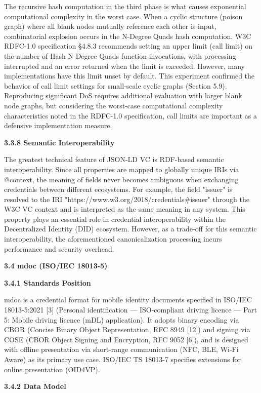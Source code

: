 The recursive hash computation in the third phase is what causes exponential computational complexity in the worst case. When a cyclic structure (poison graph) where all blank nodes mutually reference each other is input, combinatorial explosion occurs in the N-Degree Quads hash computation. W3C RDFC-1.0 specification §4.8.3 recommends setting an upper limit (call limit) on the number of Hash N-Degree Quads function invocations, with processing interrupted and an error returned when the limit is exceeded. However, many implementations have this limit unset by default. This experiment confirmed the behavior of call limit settings for small-scale cyclic graphs (Section 5.9). Reproducing significant DoS requires additional evaluation with larger blank node graphs, but considering the worst-case computational complexity characteristics noted in the RDFC-1.0 specification, call limits are important as a defensive implementation measure.

\textbf{3.3.8 Semantic Interoperability}

The greatest technical feature of JSON-LD VC is RDF-based semantic interoperability. Since all properties are mapped to globally unique IRIs via @context, the meaning of fields never becomes ambiguous when exchanging credentials between different ecosystems. For example, the field "issuer" is resolved to the IRI "https://www.w3.org/2018/credentials\#issuer" through the W3C VC context and is interpreted as the same meaning in any system. This property plays an essential role in credential interoperability within the Decentralized Identity (DID) ecosystem. However, as a trade-off for this semantic interoperability, the aforementioned canonicalization processing incurs performance and security overhead.

\textbf{3.4 mdoc (ISO/IEC 18013-5)}

\textbf{3.4.1 Standards Position}

mdoc is a credential format for mobile identity documents specified in ISO/IEC 18013-5:2021 {[}3{]} (Personal identification --- ISO-compliant driving licence --- Part 5: Mobile driving licence (mDL) application). It adopts binary encoding via CBOR (Concise Binary Object Representation, RFC 8949 {[}12{]}) and signing via COSE (CBOR Object Signing and Encryption, RFC 9052 {[}6{]}), and is designed with offline presentation via short-range communication (NFC, BLE, Wi-Fi Aware) as its primary use case. ISO/IEC TS 18013-7 specifies extensions for online presentation (OID4VP).

\textbf{3.4.2 Data Model}

